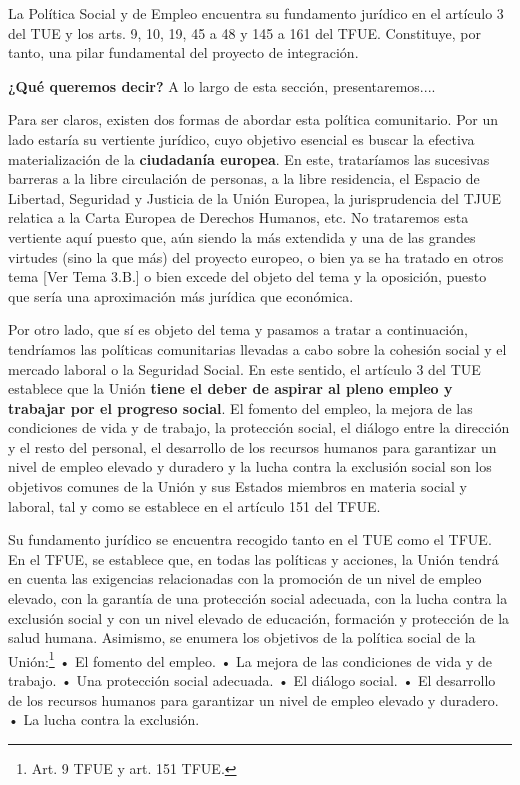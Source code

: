 \documentclass[10pt,a4paper]{article}
\newcommand{\authorfont}[1]{{\fontfamily{EBGaramond-TLF}\selectfont #1}}
\begin{document}
La Política Social y de Empleo encuentra su fundamento jurídico en el artículo 3 del TUE y los arts. 9, 10, 19, 45 a 48 y 145 a 161 del TFUE. Constituye, por tanto, una pilar fundamental del proyecto de integración.

\textbf{¿Qué queremos decir?} A lo largo de esta sección, presentaremos....

Para ser claros, existen dos formas de abordar esta política comunitario. Por un lado estaría su vertiente jurídico, cuyo objetivo esencial es buscar la efectiva materialización de la \textbf{ciudadanía europea}. En este, trataríamos las sucesivas barreras a la libre circulación de personas, a la libre residencia, el Espacio de Libertad, Seguridad y Justicia de la Unión Europea, la jurisprudencia del TJUE relatica a la Carta Europea de Derechos Humanos, etc. No trataremos esta vertiente aquí puesto que, aún siendo la más extendida y una de las grandes virtudes (sino la que más) del proyecto europeo, o bien ya se ha tratado en otros tema [\authorfont{Ver Tema 3.B.}] o bien excede del objeto del tema y la oposición, puesto que sería una aproximación más jurídica que económica. 

Por otro lado, que sí es objeto del tema y pasamos a tratar a continuación, tendríamos las políticas comunitarias llevadas a cabo sobre la cohesión social y el mercado laboral o la Seguridad Social. En este sentido, el artículo 3 del TUE establece que la Unión \textbf{tiene el deber de aspirar al pleno empleo y trabajar por el progreso social}. El fomento del empleo, la mejora de las condiciones de vida y de trabajo, la protección social, el diálogo entre la dirección y el resto del personal, el desarrollo de los recursos humanos para garantizar un nivel de empleo elevado y duradero y la lucha contra la exclusión social son los objetivos comunes de la Unión y sus Estados miembros en materia social y laboral, tal y como se establece en el artículo 151 del TFUE.

Su fundamento jurídico se encuentra recogido tanto en el TUE como el TFUE. En el TFUE, se establece que, en todas las políticas y acciones, la Unión tendrá en cuenta las exigencias relacionadas con la promoción de un nivel de empleo elevado, con la garantía de una protección social adecuada, con la lucha contra la exclusión social y con un nivel elevado de educación, formación y protección de la salud humana. Asimismo, se enumera los objetivos de la política social de la Unión:\footnote{Art. 9 TFUE y art. 151 TFUE.}
• El fomento del empleo.
• La mejora de las condiciones de vida y de trabajo.
• Una protección social adecuada.
• El diálogo social.
• El desarrollo de los recursos humanos para garantizar un nivel de empleo elevado y duradero.
• La lucha contra la exclusión.
\end{document}
